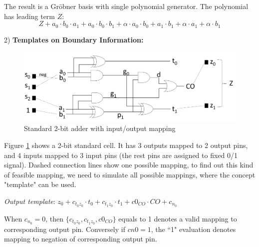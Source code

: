The result is a Gr\"obner basis with single polynomial generator. The polynomial has leading term $Z$:
$$Z+a_0\cdot b_0\cdot a_1+a_0\cdot b_0\cdot b_1+\alpha\cdot a_0\cdot b_0+a_1\cdot b_1+\alpha\cdot a_1+\alpha\cdot b_1$$


2) {\bf Templates on Boundary Information:}
\begin{figure}[h]
	\begin{center}
	\includegraphics[width=\textwidth]{newfig/template.pdf}
	\end{center}
	\caption{Standard 2-bit adder with input/output mapping}
	\label{fig:template}
\end{figure}

Figure \ref{fig:template} shows a 2-bit standard cell. It has 3 outputs mapped to 2 output pins,
and 4 inputs mapped to 3 input pins (the rest pins are assigned to fixed 0/1 signal). Dashed connection
lines show one possible mapping, to find out this kind of feasible mapping, we need to simulate
all possible mappings, where the concept "template" can be used.

{\it Output template}: $z_0+c_{{t_0}{z_0}}\cdot t_0+c_{t_1z_0}\cdot t_1+c0_{CO}\cdot CO+c_{n_0}$

When $c_{n_0} = 0$, then $\{c_{t_0z_0},c_{t_1z_0},c0_{CO}\}$ equals to 1 denotes a valid mapping to corresponding output pin. 
Conversely if $cn0 = 1$, the ``1" evaluation denotes mapping to negation of corresponding output pin.

